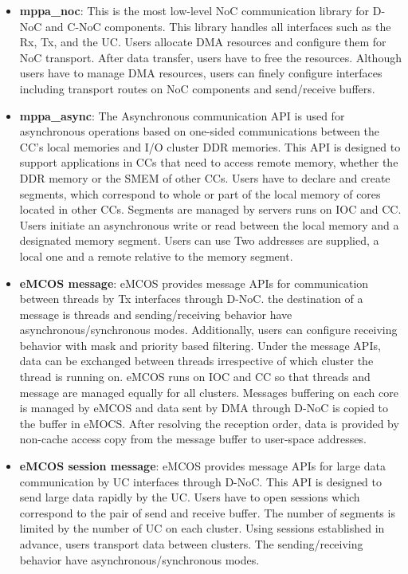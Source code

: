 \begin{itemize}
  \setlength{\leftskip}{-5mm}
  \item \textbf{mppa\_noc}: This is the most low-level NoC communication library for D-NoC and C-NoC components.
  This library handles all interfaces such as the Rx, Tx, and the UC.
  Users allocate DMA resources and configure them for NoC transport.
  After data transfer, users have to free the resources.
  Although users have to manage DMA resources, users can finely configure interfaces including transport routes on NoC components and send/receive buffers.
  \item \textbf{mppa\_async}: The Asynchronous communication API is used for asynchronous operations based on one-sided communications between the CC's local memories and I/O cluster DDR memories. 
  This API is designed to support applications in CCs that need to access remote memory, whether the DDR memory or the SMEM of other CCs.
  Users have to declare and create segments, which correspond to whole or part of the local memory of cores located in other CCs.
  Segments are managed by servers runs on IOC and CC.
  Users initiate an asynchronous write or read between the local memory and a designated memory segment.
  Users can use Two addresses are supplied, a local one and a remote relative to the memory segment.
  \item \textbf{eMCOS message}: eMCOS provides message APIs for communication between threads by Tx interfaces through D-NoC.
  the destination of a message is threads and sending/receiving behavior have asynchronous/synchronous modes.
  Additionally, users can configure receiving behavior with mask and priority based filtering.
  Under the message APIs, data can be exchanged between threads irrespective of which cluster the thread is running on.
  eMCOS runs on IOC and CC so that threads and message are managed equally for all clusters.
  Messages buffering on each core is managed by eMCOS and data sent by DMA through D-NoC is copied to the buffer in eMOCS.
  After resolving the reception order, data is provided by non-cache access copy from the message buffer to user-space addresses.
  \item \textbf{eMCOS session message}: eMCOS provides message APIs for large data communication by UC interfaces through D-NoC.
  This API is designed to send large data rapidly by the UC.
  Users have to open sessions which correspond to the pair of send and receive buffer.
  The number of segments is limited by the number of UC on each cluster.
  Using sessions established in advance, users transport data between clusters.
  The sending/receiving behavior have asynchronous/synchronous modes.
\end{itemize}


